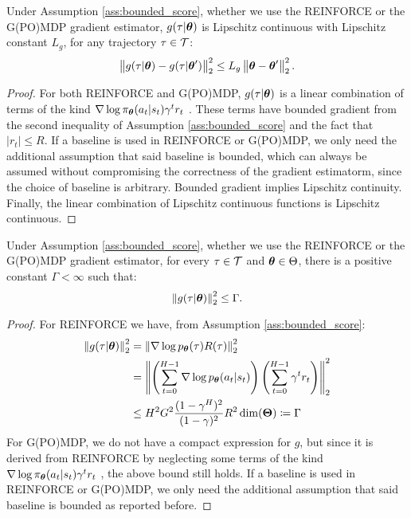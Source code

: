 \begin{lemma}\label{lemma:gsmooth}
	Under Assumption \ref{ass:bounded_score}, whether we use the REINFORCE or the G(PO)MDP gradient estimator, $g(\tau\vert\vtheta)$ is Lipschitz continuous with Lipschitz constant $L_g$, \ie for any trajectory $\tau\in\Tspace$:
	\[
	\norm[2]{g(\tau\vert\vtheta)-g(\tau\vert\vtheta')}^2 \leq L_g\norm[2]{\vtheta-\vtheta'}^2.
	\]
\end{lemma}
\begin{proof}
	For both REINFORCE and G(PO)MDP, $g(\tau\vert\vtheta)$ is a linear combination of terms of the kind $\nabla \log \pi_{\vtheta}(a_t\vert s_t)\gamma^t r_t$ \citep{peters2008reinforcement}. These terms have bounded gradient from the second inequality of Assumption \ref{ass:bounded_score} and the fact that $|r_t|\leq R$. If a baseline is used in REINFORCE or G(PO)MDP, we only need the additional assumption that said baseline is bounded, which can always be assumed without compromising the correctness of the gradient estimatorm, since the choice of baseline is arbitrary.
	Bounded gradient implies Lipschitz continuity. Finally, the linear combination of Lipschitz continuous functions is Lipschitz continuous.
\end{proof}

\begin{lemma}\label{lemma:gbound}
	Under Assumption \ref{ass:bounded_score}, whether we use the REINFORCE or the G(PO)MDP gradient estimator, for every $\tau\in\Tspace$ and $\vtheta\in\Theta$, there is a positive constant $\Gamma<\infty$ such that:
	\[
	\norm[2]{g(\tau\vert\vtheta)}^2 \leq \Gamma.
	\]
\end{lemma}
\begin{proof}
	For REINFORCE we have, from Assumption \ref{ass:bounded_score}:
	\begin{align*}
	\norm[2]{g(\tau\vert\vtheta)}^2 &=
	\norm[2]{\score{\vtheta}{\tau}R(\tau)}^2 \\
	&=\norm[2]{\left(\sum_{t=0}^{H-1}\score{\vtheta}{a_t\vert s_t}\right)\left(\sum_{t=0}^{H-1}\gamma^t r_t\right)}^2 \\
	&\leq H^2G^2\frac{(1-\gamma^H)^2}{(1-\gamma)^2}R^2\dim(\vTheta) \coloneqq \Gamma
	\end{align*}
	For G(PO)MDP, we do not have a compact expression for $g$, but since it is derived from REINFORCE by neglecting some terms of the kind $\nabla \log \pi_{\vtheta}(a_t | s_t)\gamma^t r_t$ \citep{baxter2001infinite,peters2008reinforcement}, the above bound still holds.
	If a baseline is used in REINFORCE or G(PO)MDP, we only need the additional assumption that said baseline is bounded as reported before.
\end{proof}

